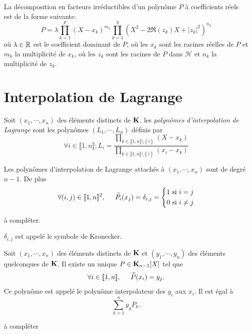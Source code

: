 \begin{prop}
 La décomposition en facteurs irréductibles d'un polynôme $P$ à coefficients réels est de la forme suivante.
\begin{displaymath}
 P = \lambda \prod_{k=1}^p(X-x_k)^{m_k}\prod_{k=1}^q(X^2 - 2\Re(z_k)X+|z_k|^2)^{n_k}
\end{displaymath}
où $\lambda\in \mathbb{R}$ est le coefficient dominant de $P$, où les $x_k$ sont les racines réelles de $P$ et $m_k$ la multiplicité de $x_k$, où les $z_k$ sont les racines de $P$ dans $\mathcal H$ et $n_k$ la multiplicité de $z_k$.
\end{prop}

\section{Interpolation de Lagrange}
\begin{defi}
 Soit $(x_1, \cdots, x_n)$ des éléments distincts de $\mathbf{K}$. les \emph{polynômes d'interpolation de Lagrange} sont les polynômes $(L_1, \cdots ,L_n)$ définis par
\[
\forall i \in \llbracket 1,n\rrbracket; L_i =
\frac{\prod_{k \in \llbracket 1,n \rrbracket \setminus \left\lbrace i\right\rbrace }(X-x_k)}
     {\prod_{k \in \llbracket 1,n \rrbracket \setminus \left\lbrace i\right\rbrace }(x_i-x_k)}
\]
\end{defi}
\begin{prop}
 Les polynômes d'interpolation de Lagrange attachés à $(x_1,\cdots, x_n)$ sont de degré $n-1$. De plus
\[
 \forall (i,j)\in \llbracket 1,n \rrbracket^2, \hspace{0.5cm}
\widetilde{P_i}(x_j) = \delta_{i,j}
=
\left\lbrace 
\begin{aligned}
 1 &\text{ si } i= j\\ 0 &\text{ si } i \neq j
\end{aligned}
\right. 
\]
\end{prop}
\begin{demo}
 à compléter.
\end{demo}
\begin{rem}
 $\delta_{i,j}$ est appelé le symbole de Kronecker.
\end{rem}

\begin{prop}
 Soit $(x_1, \cdots, x_n)$ des éléments distincts de $\mathbf{K}$ et $(y_1,\cdots, y_n)$ des éléments quelconques de $\mathbf{K}$. Il existe un unique $P\in \mathbf{K}_{n-1}[X]$ tel que
\[
 \forall i \in \llbracket 1,n \rrbracket,\hspace{0.5cm} \widetilde{P}(x_i) = y_j.
\]
Ce polynôme est appelé le polynôme interpolateur des $y_i$ aux $x_i$. Il est égal à
\[
 \sum_{k=1}^n y_yP_k.
\]

\end{prop} 
\begin{demo}
 à compléter
\end{demo}

